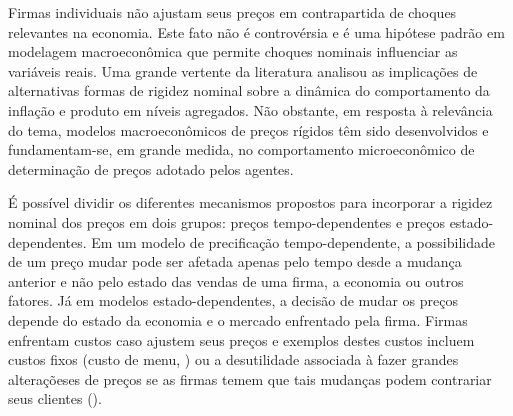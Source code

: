 \documentclass[twoside,a4paper,11pt]{report}
\begin{document}




Firmas individuais não ajustam seus preços em contrapartida de choques relevantes na economia. Este fato não é controvérsia e é uma hipótese padrão em modelagem macroeconômica que permite choques nominais influenciar as variáveis reais. Uma grande vertente da literatura analisou as implicações de alternativas formas de rigidez nominal sobre a dinâmica do comportamento da inflação e produto em níveis agregados. Não obstante, em resposta à relevância do tema, modelos macroeconômicos de preços rígidos têm sido desenvolvidos e fundamentam-se, em grande medida, no comportamento microeconômico de determinação de preços adotado pelos agentes. 

É possível dividir os diferentes mecanismos propostos para incorporar a rigidez nominal dos preços em dois grupos: preços tempo-dependentes e preços estado-dependentes. Em um modelo de precificação tempo-dependente, a possibilidade de um preço mudar pode ser afetada apenas pelo tempo desde a mudança anterior e não pelo estado das vendas de uma firma, a economia ou outros fatores. Já em modelos estado-dependentes, a decisão de mudar os preços depende do estado da economia e o mercado enfrentado pela firma. Firmas enfrentam custos caso ajustem seus preços e exemplos destes custos incluem custos fixos (custo de menu, \citet{mankiw1985small}) ou a desutilidade associada à fazer grandes alteraçõeses de preços se as firmas temem que tais mudanças podem contrariar seus clientes (\citet{rotemberg1982sticky}). 
\end{document}
